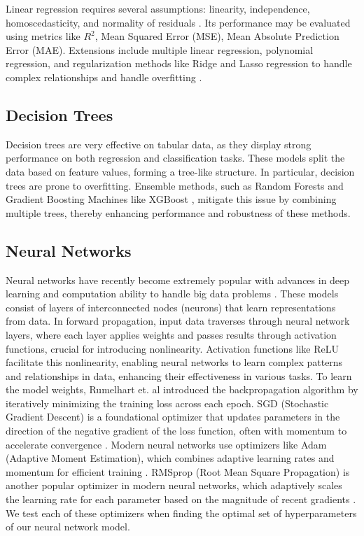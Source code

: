 \documentclass[conference]{IEEEtran}
\begin{document}
Linear regression requires several assumptions: linearity, independence, homoscedasticity, and normality of residuals \cite{Kutner}. Its performance may be  evaluated using metrics like $R^2$, Mean Squared Error (MSE), Mean Absolute Prediction Error (MAE). Extensions include multiple linear regression, polynomial regression, and regularization methods like Ridge and Lasso regression to handle complex relationships and handle overfitting \cite{Wright, Weisberg}.

\subsection{Decision Trees}

Decision trees are very effective on tabular data, as they display strong performance on both regression and classification tasks. These models split the data based on feature values, forming a tree-like structure. In particular, decision trees are prone to overfitting. Ensemble methods, such as Random Forests \cite{Breiman} and Gradient Boosting Machines like XGBoost \cite{Chen}, mitigate this issue by combining multiple trees, thereby enhancing performance and robustness of these methods.

\subsection{Neural Networks}

Neural networks have recently become extremely popular with advances in deep learning and computation ability to handle big data problems \cite{LeCun}. These models consist of layers of interconnected nodes (neurons) that learn representations from data. In forward propagation, input data traverses through neural network layers, where each layer applies weights and passes results through activation functions, crucial for introducing nonlinearity. Activation functions like ReLU facilitate this nonlinearity, enabling neural networks to learn complex patterns and relationships in data, enhancing their effectiveness in various tasks. To learn the model weights, Rumelhart et. al \cite{Rumelhart} introduced the backpropagation algorithm by iteratively minimizing the training loss across each epoch. SGD (Stochastic Gradient Descent) is a foundational optimizer that updates parameters in the direction of the negative gradient of the loss function, often with momentum to accelerate convergence \cite{Bottou}. Modern neural networks use optimizers like Adam (Adaptive Moment Estimation), which combines adaptive learning rates and momentum for efficient training \cite{Kingma}. RMSprop (Root Mean Square Propagation) is another popular optimizer in modern neural networks, which adaptively scales the learning rate for each parameter based on the magnitude of recent gradients \cite{Tieleman}. We test each of these optimizers when finding the optimal set of hyperparameters of our neural network model. 
\end{document}
